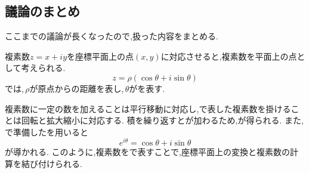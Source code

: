     \subsection{議論のまとめ}\label{節：議論のまとめ}
    ここまでの議論が長くなったので,扱った内容をまとめる.

    複素数$z=x+iy$を座標平面上の点$(x,y)$に対応させると,複素数を平面上の点として考えられる.
    \[
      z=\rho(\cos\theta+i\sin\theta)
    \]
    では,\,$\rho$が原点からの距離を表し,\,$\theta$がを表す.

    複素数に一定の数を加えることは平行移動に対応し,で表した複素数を掛けることは回転と拡大縮小に対応する.
    積を繰り返すとが加わるため,が得られる.
    また,\,で準備したを用いると
    \[
      e^{i\theta}=\cos\theta+i\sin\theta
    \]
    が導かれる.
    このように,複素数をで表すことで,座標平面上の変換と複素数の計算を結び付けられる.
